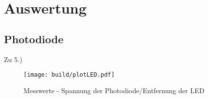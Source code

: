\newpage
\section{Auswertung}
\label{sec:Auswertung}
\subsection{Photodiode}
Zu 5.)\\

\begin{figure}
    \centering
    \texttt{[image: build/plotLED.pdf]}
    \caption{Messwerte - Spannung der Photodiode/Entfernung der LED}        
    \label{fig:plotLED}
\end{figure}

